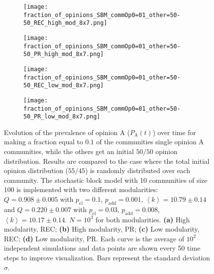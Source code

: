 \documentclass[11 pt , letterpaper , twoside , openright]{book}
\begin{document}
\begin{figure}[H]
  \begin{subfigure}[b]{0.49\textwidth}
    \caption{}
  	\texttt{[image: fraction\_of\_opinions\_SBM\_commOp0=01\_other=50-50\_REC\_high\_mod\_8x7.png]}
    \label{high_mod_rec}
  \end{subfigure}
  \begin{subfigure}[b]{0.49\textwidth}
    \caption{}
  	\texttt{[image: fraction\_of\_opinions\_SBM\_commOp0=01\_other=50-50\_PR\_high\_mod\_8x7.png]}
    \label{high_mod_pr}
  \end{subfigure}
  \begin{subfigure}[b]{0.49\textwidth}
   \caption{}
    \texttt{[image: fraction\_of\_opinions\_SBM\_commOp0=01\_other=50-50\_REC\_low\_mod\_8x7.png]}
    \label{low_mod_rec}
  \end{subfigure}
  \begin{subfigure}[b]{0.49\textwidth}
    \caption{}
    \texttt{[image: fraction\_of\_opinions\_SBM\_commOp0=01\_other=50-50\_PR\_low\_mod\_8x7.png]}
    \label{low_mod_pr}
  \end{subfigure}
  \captionsetup{format=plain}
  \caption[Evolution of the prevalence of opinion A ($P_\text{A}(t)$) over time for making a fraction equal to $0.1$ of the communities single opinion A communities, while the others get an initial $50/50$ opinion distribution. Results are compared to the case where the total initial opinion distribution ($55/45$) is randomly distributed over each community.]{Evolution of the prevalence of opinion A ($P_\text{A}(t)$) over time for making a fraction equal to $0.1$ of the communities single opinion A communities, while the others get an initial $50/50$ opinion distribution. Results are compared to the case where the total initial opinion distribution ($55/45$) is randomly distributed over each community. The stochastic block model with 10 communities of size 100 is implemented with two different modularities: $Q = 0.908 \pm 0.005$ with $p_{\text{cl}} = 0.1$, $p_{\text{add}} = 0.001$, $\left<k\right> = 10.79 \pm 0.14$ and $Q = 0.220 \pm 0.007$ with $p_{\text{cl}} = 0.03$, $p_{\text{add}} = 0.008$, $\left<k\right> = 10.17 \pm 0.14$. $N = 10^3$ for both modularities. \textbf{(a)} High modularity, REC; \textbf{(b)} High modularity, PR; \textbf{(c)} Low modularity, REC; \textbf{(d)} Low modularity, PR. Each curve is the average of $10^2$ independent simulations and data points are shown every 50 time steps to improve visualization. Bars represent the standard deviation $\sigma$.}
\label{commOp0_01_other_50-50}
\end{figure}
\end{document}
